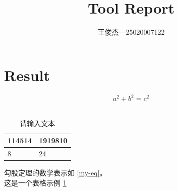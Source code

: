 \documentclass{article}
\begin{document}
\title{Tool Report}
\author{王俊杰—25020007122}
\maketitle
\section{Result}
\begin{equation}
  a^2+b^2=c^2
 \label{my-eq}
\end{equation}
\\
\begin{table}[h!]
  \centering
  \caption{请输入文本}
  \label{my-table}
  \begin{tabular}{|l|l|}
    \hline
    114514 & 1919810 \\
    \hline
    8      & 24 \\
    \hline
  \end{tabular}
\end{table}
勾股定理的数学表示如 \eqref{my-eq}。\\
这是一个表格示例 \ref{my-table}
\end{document}

